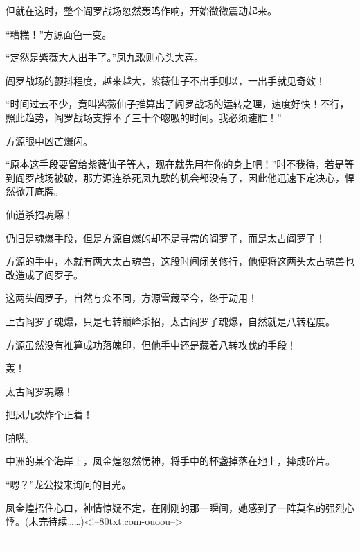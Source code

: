 \begin{this_body}
但就在这时，整个阎罗战场忽然轰鸣作响，开始微微震动起来。

“糟糕！”方源面色一变。

“定然是紫薇大人出手了。”凤九歌则心头大喜。

阎罗战场的颤抖程度，越来越大，紫薇仙子不出手则以，一出手就见奇效！

“时间过去不少，竟叫紫薇仙子推算出了阎罗战场的运转之理，速度好快！不行，照此趋势，阎罗战场支撑不了三十个唿吸的时间。我必须速胜！”

方源眼中凶芒爆闪。

“原本这手段要留给紫薇仙子等人，现在就先用在你的身上吧！”时不我待，若是等到阎罗战场被破，那方源连杀死凤九歌的机会都没有了，因此他迅速下定决心，悍然掀开底牌。

仙道杀招魂爆！

仍旧是魂爆手段，但是方源自爆的却不是寻常的阎罗子，而是太古阎罗子！

方源的手中，本就有两大太古魂兽，这段时间闭关修行，他便将这两头太古魂兽也改造成了阎罗子。

这两头阎罗子，自然与众不同，方源雪藏至今，终于动用！

上古阎罗子魂爆，只是七转巅峰杀招，太古阎罗子魂爆，自然就是八转程度。

方源虽然没有推算成功落魄印，但他手中还是藏着八转攻伐的手段！

轰！

太古阎罗魂爆！

把凤九歌炸个正着！

啪嗒。

中洲的某个海岸上，凤金煌忽然愣神，将手中的杯盏掉落在地上，摔成碎片。

“嗯？”龙公投来询问的目光。

凤金煌捂住心口，神情惊疑不定，在刚刚的那一瞬间，她感到了一阵莫名的强烈心悸。(未完待续……)<!--80txt.com-ouoou-->

------------

\end{this_body}

